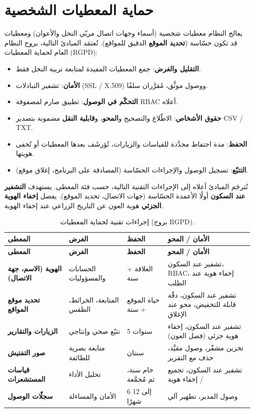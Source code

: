 \section{حماية المعطيات الشخصية}
يعالج النظام معطيات شخصية (أسماء وجهات اتصال مربّي النحل والأعوان) ومعطيات قد
تكون حسّاسة (\textbf{تحديد الموقع} الدقيق للمواقع). تُعتمَد المبادئ التالية،
بروح النظام العام لحماية المعطيات (RGPD):
\begin{itemize}
  \item \textbf{التقليل والغرض}: جمع المعطيات المفيدة لمتابعة تربية النحل فقط.
  \item \textbf{الأمان}: تشفير التبادلات (SSL / X.509) ووصول موثَّق، مُقرَّران سلفًا.
  \item \textbf{التحكّم في الوصول}: تطبيق صارم لمصفوفة RBAC أعلاه.
  \item \textbf{حقوق الأشخاص}: الاطّلاع والتصحيح و\textbf{المحو}، و\textbf{قابلية النقل} مضمونة بتصدير CSV / TXT.
  \item \textbf{الحفظ}: مدة احتفاظ محدَّدة للقياسات والزيارات، تُؤرشَف بعدها المعطيات أو تُخفى هويتها.
  \item \textbf{التتبّع}: تسجيل الوصول والإجراءات الحسّاسة (المصادقة على البرنامج، إغلاق موقع).
\end{itemize}

تُترجَم المبادئ أعلاه إلى الإجراءات التقنية التالية، حسب فئة المعطى. يستهدف
\textbf{التشفير عند السكون} أولًا الأعمدة الحسّاسة (جهات الاتصال، تحديد الموقع).
يفصل \textbf{إخفاء الهوية الجزئي} هوية العون عن التاريخ الزراعي عند إخفاء الهوية.

{\small
\begin{xltabular}{\textwidth}{>{\bfseries}p{3.1cm} p{3.3cm} p{2.7cm} X}
\caption{إجراءات تقنية لحماية المعطيات (بروح RGPD).}
\label{tab:rgpd}\\
\toprule
\textbf{المعطى} & \textbf{الغرض} & \textbf{الحفظ} & \textbf{الأمان / المحو} \\
\midrule
\endfirsthead
\toprule
\textbf{المعطى} & \textbf{الغرض} & \textbf{الحفظ} & \textbf{الأمان / المحو} \\
\midrule
\endhead
الهوية (الاسم، جهة الاتصال) & الحسابات والمسؤوليات & العلاقة + سنة & تشفير عند السكون، RBAC، إخفاء هوية عند الطلب \\
تحديد موقع المواقع & المتابعة، الخرائط، الطقس & حياة الموقع + سنة & تشفير عند السكون، دقّة قابلة للتخفيض، محو عند الإغلاق \\
الزيارات والتقارير & تتبّع صحي وإنتاجي & 5 سنوات & تشفير عند السكون، إخفاء هوية جزئي (فصل العون) \\
صور التفتيش & متابعة بصرية للطائفة & سنتان & تخزين مشفّر، وصول مقيَّد، حذف مع التقرير \\
قياسات المستشعرات & تحليل الأداء & خام سنة، ثم مُجمَّعة & تشفير عند السكون، تجميع / إخفاء هوية \\
سجلّات الوصول & الأمان والمساءلة & 6 إلى 12 شهرًا & وصول المدير، تطهير آلي \\
\bottomrule
\end{xltabular}}

